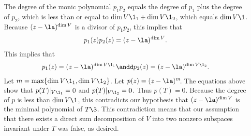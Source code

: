 \begin{Solution}
The degree of the monic polynomial $p_1 p_2$ equals the degree of $p_1$ plus the
degree of $p_2$, which is less than or equal to $\dim V\1_1 + \dim V\1_2$, which equals
$\dim V\1$.  Because $(z - \la)^{\dim V}$ is a divisor of $p_1 p_2$, this implies
that
\[
p_1(z) p_2(z) = (z - \la)^{\dim V}.
\]
This implies that
\[
p_1(z) = (z - \la)^{\dim V\1_1} \andd p_2(z) = (z - \la)^{\dim V\1_2}.
\]
Let $m = \max \{\dim V\1_1, \dim V\1_2 \}$.  Let
$p(z) = (z - \la)^m\!$.  The equations above show that
$p(T)|_{V\1_1} = 0$ and $p(T)|_{V\1_2} = 0$.  Thus $p(T) = 0$.  Because the degree of
$p$ is less than $\dim V\1$, this contradicts our hypothesis that
$(z - \la)^{\dim V}$ is the minimal polynomial of $T\3$.  This contradiction means
that our assumption that there exists a direct sum decomposition of $V$ into two
nonzero subspaces invariant under $T$ was false, as desired.
\end{Solution}


